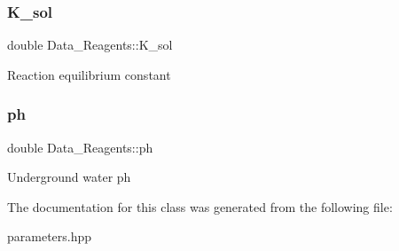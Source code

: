 \subsubsection{\texorpdfstring{K\+\_\+sol}{K\_sol}}
{\footnotesize\ttfamily double Data\+\_\+Reagents\+::\+K\+\_\+sol}

Reaction equilibrium constant \mbox{\label{classData__2Reagents_aaa48e75cb9735514e5ba6a3ce3e0cce9}} 
\subsubsection{\texorpdfstring{ph}{ph}}
{\footnotesize\ttfamily double Data\+\_\+Reagents\+::ph}

Underground water ph 

The documentation for this class was generated from the following file\+:\begin{DoxyCompactItemize}
\item 
parameters.\+hpp\end{DoxyCompactItemize}
